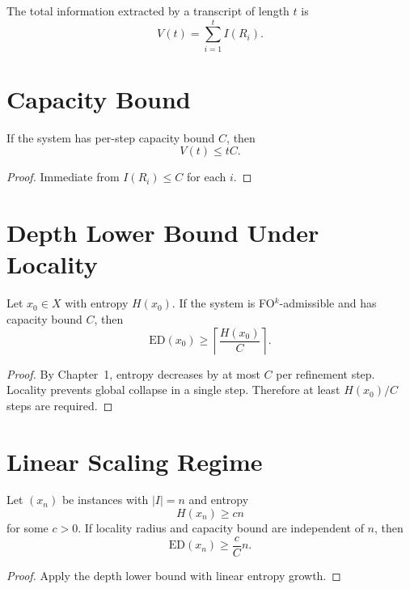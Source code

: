 \begin{definition}
The total information extracted by a transcript of length $t$ is
\[
V(t) = \sum_{i=1}^t I(R_i).
\]
\end{definition}

\section{Capacity Bound}

\begin{lemma}
If the system has per-step capacity bound $C$, then
\[
V(t) \le tC.
\]
\end{lemma}

\begin{proof}
Immediate from $I(R_i) \le C$ for each $i$.
\end{proof}

\section{Depth Lower Bound Under Locality}

\begin{theorem}
Let $x_0 \in X$ with entropy $H(x_0)$.  
If the system is FO$^k$-admissible and has capacity bound $C$, then
\[
\mathrm{ED}(x_0)
\ge
\left\lceil \frac{H(x_0)}{C} \right\rceil.
\]
\end{theorem}

\begin{proof}
By Chapter~1, entropy decreases by at most $C$ per refinement step.  
Locality prevents global collapse in a single step.  
Therefore at least $H(x_0)/C$ steps are required.
\end{proof}

\section{Linear Scaling Regime}

\begin{theorem}
Let $(x_n)$ be instances with $|I|=n$ and entropy
\[
H(x_n) \ge c n
\]
for some $c>0$.  
If locality radius and capacity bound are independent of $n$, then
\[
\mathrm{ED}(x_n) \ge \frac{c}{C} n.
\]
\end{theorem}

\begin{proof}
Apply the depth lower bound with linear entropy growth.
\end{proof}
